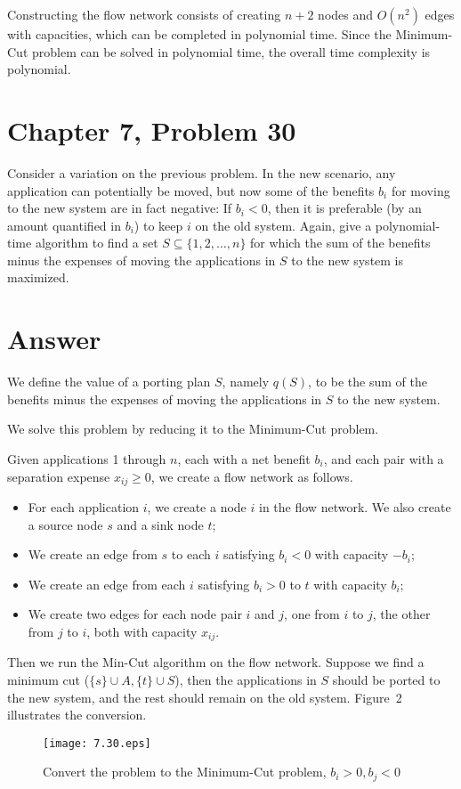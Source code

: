 \documentclass[12pt,letterpaper]{article}
\begin{document}
Constructing the flow network consists of creating $n+2$ nodes and $O(n^2)$ edges with capacities, which can be completed in polynomial time. Since the Minimum-Cut problem can be solved in polynomial time, the overall time complexity is polynomial.

\section*{Chapter 7, Problem 30}
Consider a variation on the previous problem. In the new scenario, any
application can potentially be moved, but now some of the benefits $b_i$ for
moving to the new system are in fact negative: If $b_i < 0$, then it is preferable
(by an amount quantified in $b_i$) to keep $i$ on the old system. Again, give
a polynomial-time algorithm to find a set $S \subseteq \{1, 2, \dots, n\}$ for which the
sum of the benefits minus the expenses of moving the applications in $S$
to the new system is maximized.

\section*{Answer}
We define the value of a porting plan $S$, namely $q(S)$, to be the sum of the benefits minus the
expenses of moving the applications in $S$ to the new system.

We solve this problem by reducing it to the Minimum-Cut problem.

Given applications 1 through $n$, each with a net benefit $b_i$, and each pair with a separation expense $x_{ij} \ge 0$, we create a flow network as follows.
\begin{itemize}
\item For each application $i$, we create a node $i$ in the flow network. We also create a source node $s$ and a sink node $t$;
\item We create an edge from $s$ to each $i$ satisfying $b_i<0$ with capacity $-b_i$;
\item We create an edge from each $i$ satisfying $b_i>0$ to $t$ with capacity $b_i$;
\item We create two edges for each node pair $i$ and $j$, one from $i$ to $j$, the other from $j$ to $i$, both with capacity $x_{ij}$.
\end{itemize}

Then we run the Min-Cut algorithm on the flow network. Suppose we find a minimum cut ($\{s\}\cup A, \{t\}\cup S$), then the applications in $S$ should be ported to the new system, and the rest should remain on the old system. Figure~2 illustrates the conversion.
\begin{figure}
\begin{center}
\texttt{[image: 7.30.eps]}
\caption{Convert the problem to the Minimum-Cut problem, $b_i>0, b_j<0$}
\end{center}
\end{figure}
\end{document}
